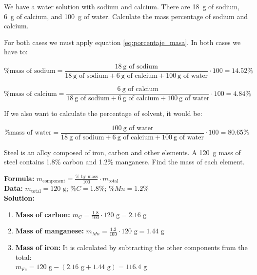 \begin{example}
    We have a water solution with sodium and calcium.
    There are \qty{18}{\g} of sodium, \qty{6}{\g} of calcium, and \qty{100}{\g} of water.
    Calculate the mass percentage of sodium and calcium.

    For both cases we must apply equation \eqref{eq:porcentaje_masa}.
    In both cases we have to:

    \begin{equation*}
        \text{\% mass of sodium} = \dfrac{\qty{18}{\g}\text{ of sodium}}{\qty{18}{\g}\text{ of sodium} + \qty{6}{\g}\text{ of calcium} + \qty{100}{\g}\text{ of water}}\cdot 100 = 14.52 \%
    \end{equation*}

    \begin{equation*}
        \text{\% mass of calcium} = \dfrac{\qty{6}{\g}\text{ of calcium}}{\qty{18}{\g}\text{ of sodium} + \qty{6}{\g}\text{ of calcium} + \qty{100}{\g}\text{ of water}}\cdot 100 = 4.84 \%
    \end{equation*}

    If we also want to calculate the percentage of solvent, it would be:

    \begin{equation*}
        \text{\% mass of water} = \dfrac{\qty{100}{\g}\text{ of water}}{\qty{18}{\g}\text{ of sodium} + \qty{6}{\g}\text{ of calcium} + \qty{100}{\g}\text{ of water}}\cdot 100 = 80.65 \%
    \end{equation*}
\end{example}

\begin{exercise}
    Steel is an alloy composed of iron, carbon and other elements. A \qty{120}{\g} mass of steel contains 1.8\% carbon and 1.2\% manganese. Find the mass of each element.
    \begin{solu}
        \textbf{Formula:} $m_{\text{component}} = \frac{\% \text{ by mass}}{100} \cdot m_{\text{total}}$ \\
        \textbf{Data:} $m_{\text{total}} = 120 \text{ g}$; $\%C = 1.8\%$; $\%Mn = 1.2\%$ \\
        \textbf{Solution:}
        \begin{enumerate}
            \item \textbf{Mass of carbon:} $m_{C} = \frac{1.8}{100} \cdot 120 \text{ g} = 2.16 \text{ g}$
            \item \textbf{Mass of manganese:} $m_{Mn} = \frac{1.2}{100} \cdot 120 \text{ g} = 1.44 \text{ g}$
            \item \textbf{Mass of iron:} It is calculated by subtracting the other components from the total: \\
            $m_{Fe} = 120 \text{ g} - (2.16 \text{ g} + 1.44 \text{ g}) = 116.4 \text{ g}$
        \end{enumerate}
    \end{solu}
\end{exercise}

